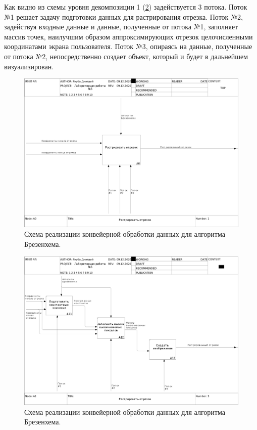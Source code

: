 \documentclass[12pt]{report}
\begin{document}
Как видно из схемы уровня декомпозиции 1 (\ref{img:conveyor:2}) задействуется 3 потока. Поток №1 решает задачу подготовки данных для растрирования отрезка. Поток №2, задействуя входные данные и данные, полученные от потока №1, заполняет массив точек, наилучшим образом аппроксимирующих отрезок целочисленными координатами экрана пользователя. Поток №3, опираясь на данные, полученные от потока №2, непосредственно создает объект, который и будет в дальнейшем визуализирован.

\begin{figure}[ht]
\begin{center}
\includegraphics[scale=0.25]{inc/img/ramus/01_A0.png}
\captionsetup{justification=centering}
	\caption{Схема реализации конвейерной обработки данных для алгоритма Брезенхема.}
	\label{img:conveyor}	
\end{center}
\end{figure}

\newpage

\begin{figure}[ht]
\begin{center}
\includegraphics[scale=0.25]{inc/img/ramus/03_A1.png}
\captionsetup{justification=centering}
	\caption{Схема реализации конвейерной обработки данных для алгоритма Брезенхема.}
	\label{img:conveyor:2}	
\end{center}
\end{figure}
\end{document}
